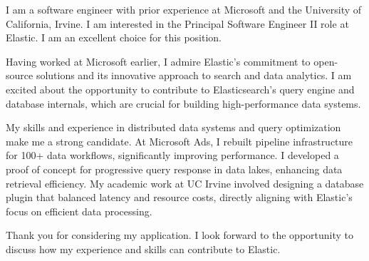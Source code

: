 I am a software engineer with prior experience at Microsoft and the University of California, Irvine. I am interested in the Principal Software Engineer II role at Elastic. I am an excellent choice for this position.

Having worked at Microsoft earlier, I admire Elastic's commitment to open-source solutions and its innovative approach to search and data analytics. I am excited about the opportunity to contribute to Elasticsearch's query engine and database internals, which are crucial for building high-performance data systems.

My skills and experience in distributed data systems and query optimization make me a strong candidate. At Microsoft Ads, I rebuilt pipeline infrastructure for 100+ data workflows, significantly improving performance. I developed a proof of concept for progressive query response in data lakes, enhancing data retrieval efficiency. My academic work at UC Irvine involved designing a database plugin that balanced latency and resource costs, directly aligning with Elastic's focus on efficient data processing.

Thank you for considering my application. I look forward to the opportunity to discuss how my experience and skills can contribute to Elastic.